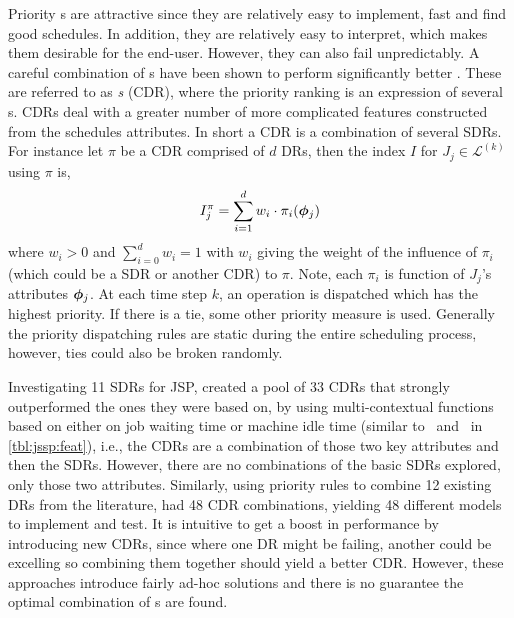 \documentclass[smallextended]{svjour3}
\begin{document}
Priority \dr s are attractive since they are relatively easy to 
implement, 
fast and find good schedules. In addition, they are relatively easy to 
interpret, which makes them desirable for the end-user.
However, they can also fail unpredictably. 
A careful combination of \dr s have been shown to perform significantly better 
\cite{Jayamohan04}. These are referred to as \emph{\cdr s} 
(CDR), where the priority ranking is an expression of several \sdr s. 
CDRs deal with a greater number of more complicated features constructed from the schedules attributes. In short a CDR is a combination of several SDRs. For 
instance let $\pi$ be a CDR comprised of $d$ DRs, then 
the index $I$ for $J_j\in\mathcal{L}^{(k)}$ using $\pi$ is, 
\begin{equation}
	I_j^{\pi} = \sum_{i=1}^d w_i \cdot \pi_i(\bm{\phi}_j) \label{eq:CDR}
\end{equation}
where $w_i>0$ and $\sum_{i=0}^d w_i = 1$ with $w_i$ giving the weight of the 
influence of $\pi_i$ (which could be a SDR or another CDR) to $\pi$. Note, 
each $\pi_i$ is function of $J_j$'s attributes $\bm{\phi}_j$.  
At each time step $k$, an operation is dispatched which has the highest 
priority.  If there is a 
tie, some other priority measure is used. Generally the priority dispatching 
rules are static during the entire scheduling process, however, ties could also 
be broken randomly. 

Investigating 11 SDRs for JSP, \cite{Lu13} created a pool of 33 CDRs that 
strongly outperformed the ones they were based on, by using multi-contextual 
functions based on either on job waiting time or machine idle time 
(similar to \phiwait\ and \phimacSlack\ in \cref{tbl:jssp:feat}), i.e., the 
CDRs are a combination of those two key attributes and then the SDRs. 
However, there are no combinations of the basic SDRs explored, only those two 
attributes.  
Similarly, using priority rules to combine 12 existing DRs from the literature, 
\cite{Yu13} had 48 CDR combinations, yielding 48 different models 
to implement and test. 
It is intuitive to get a boost in performance by introducing new CDRs, since 
where one DR might be failing, another could be excelling so combining them 
together should yield a better CDR. However, these approaches introduce fairly 
ad-hoc solutions and there is no guarantee the optimal combination of 
\dr s are found.
\end{document}

